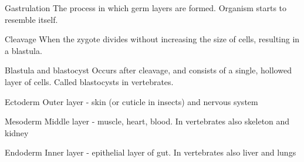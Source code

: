 \begin{flashcard}[Definition]{Gastrulation}
	The process in which germ layers are formed. Organism starts to resemble itself. 
\end{flashcard}

\begin{flashcard}[Definition]{Cleavage}
	When the zygote divides without increasing the size of cells, resulting in a blastula. 
\end{flashcard}

\begin{flashcard}[Definition]{Blastula and blastocyst}
	Occurs after cleavage, and consists of a single, hollowed layer of cells. Called blastocysts in vertebrates. 
\end{flashcard}

\begin{flashcard}{Ectoderm}
	Outer layer - skin (or cuticle in insects) and nervous system
\end{flashcard}

\begin{flashcard}{Mesoderm}
	Middle layer - muscle, heart, blood. In vertebrates also skeleton and kidney
\end{flashcard}

\begin{flashcard}{Endoderm}
	Inner layer - epithelial layer of gut. In vertebrates also liver and lungs
\end{flashcard}
